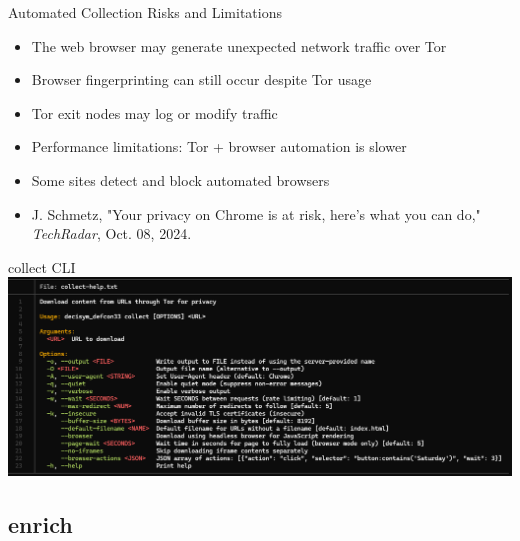 \documentclass[pdf,aspectratio=169]{beamer}
\begin{document}
\begin{frame}{Automated Collection Risks and Limitations}
  \begin{itemize}
  \item The web browser may generate unexpected network traffic over Tor
  \item Browser fingerprinting can still occur despite Tor usage
  \item Tor exit nodes may log or modify traffic
  \item Performance limitations: Tor + browser automation is slower
  \item Some sites detect and block automated browsers
  \item J. Schmetz, "Your privacy on Chrome is at risk, here's what
    you can do," \textit{TechRadar}, Oct. 08, 2024.
  \end{itemize}
\end{frame}

\begin{frame}{collect CLI}
  \centering
  \includegraphics[height=0.75\textheight]{collect-help.png}
\end{frame}

\subsection{enrich}
\end{document}
